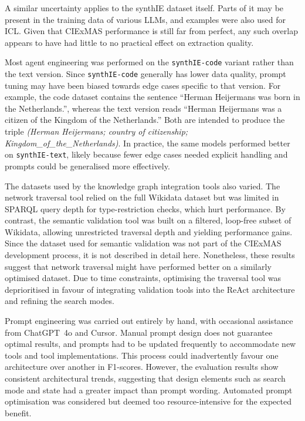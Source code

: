 \documentclass[a4paper,oneside,bibliography=totoc]{scrbook}
\begin{document}
A similar uncertainty applies to the synthIE dataset itself. Parts of it may be present in the training data of various \acp{LLM}, and examples were also used for \ac{ICL}. Given that CIExMAS performance is still far from perfect, any such overlap appears to have had little to no practical effect on extraction quality.

Most agent engineering was performed on the \texttt{synthIE-code} variant rather than the text version. Since \texttt{synthIE-code} generally has lower data quality, prompt tuning may have been biased towards edge cases specific to that version. For example, the code dataset contains the sentence \enquote{Herman Heijermans was born in the Netherlands.}, whereas the text version reads \enquote{Herman Heijermans was a citizen of the Kingdom of the Netherlands.} Both are intended to produce the triple \textit{(Herman Heijermans; country of citizenship; Kingdom\_of\_the\_Netherlands)}. In practice, the same models performed better on \texttt{synthIE-text}, likely because fewer edge cases needed explicit handling and prompts could be generalised more effectively.

The datasets used by the knowledge graph integration tools also varied. The network traversal tool relied on the full Wikidata dataset but was limited in \ac{SPARQL} query depth for type-restriction checks, which hurt performance. By contrast, the semantic validation tool was built on a filtered, loop-free subset of Wikidata, allowing unrestricted traversal depth and yielding performance gains. Since the dataset used for semantic validation was not part of the CIExMAS development process, it is not described in detail here. Nonetheless, these results suggest that network traversal might have performed better on a similarly optimised dataset. Due to time constraints, optimising the traversal tool was deprioritised in favour of integrating validation tools into the ReAct architecture and refining the search modes.

Prompt engineering was carried out entirely by hand, with occasional assistance from ChatGPT~4o and Cursor. Manual prompt design does not guarantee optimal results, and prompts had to be updated frequently to accommodate new tools and tool implementations. This process could inadvertently favour one architecture over another in F1-scores. However, the evaluation results show consistent architectural trends, suggesting that design elements such as search mode and state had a greater impact than prompt wording. Automated prompt optimisation was considered but deemed too resource-intensive for the expected benefit.
\end{document}
